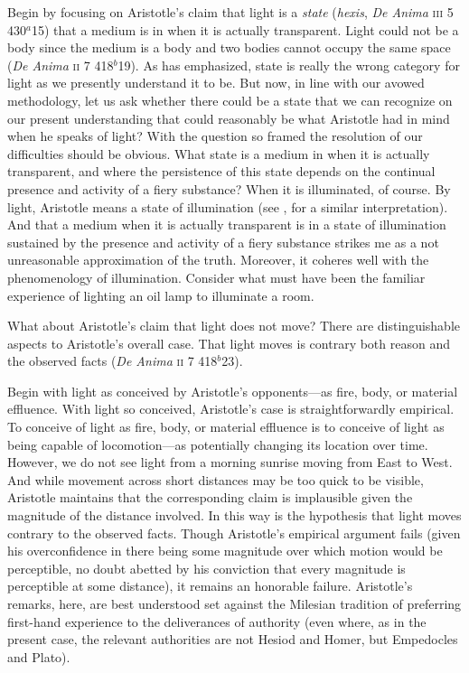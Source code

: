Begin by focusing on Aristotle's claim that light is a \emph{state} (\emph{hexis}, \emph{De Anima} \textsc{iii} 5 430\( ^{a} \)15) that a medium is in when it is actually transparent. Light could not be a body since the medium is a body and two bodies cannot occupy the same space (\emph{De Anima} \textsc{ii} 7 418\( ^{b} \)19). As \citet{Burnyeat:1995fk} has emphasized, state is really the wrong category for light as we presently understand it to be. But now, in line with our avowed methodology, let us ask whether there could be a state that we can recognize on our present understanding that could reasonably be what Aristotle had in mind when he speaks of light? With the question so framed the resolution of our difficulties should be obvious. What state is a medium in when it is actually transparent, and where the persistence of this state depends on the continual presence and activity of a fiery substance? When it is illuminated, of course. By light, Aristotle means a state of illumination (see \citealt[122]{Thorp:1982fk}, for a similar interpretation). And that a medium when it is actually transparent is in a state of illumination sustained by the presence and activity of a fiery substance strikes me as a not unreasonable approximation of the truth. Moreover, it coheres well with the phenomenology of illumination. Consider what must have been the familiar experience of lighting an oil lamp to illuminate a room.

What about Aristotle's claim that light does not move? There are distinguishable aspects to Aristotle's overall case. That light moves is contrary both reason and the observed facts (\emph{De Anima} \textsc{ii} 7 418\( ^{b} \)23).

Begin with light as conceived by Aristotle's opponents---as fire, body, or material effluence. With light so conceived, Aristotle's case is straightforwardly empirical. To conceive of light as fire, body, or material effluence is to conceive of light as being capable of locomotion---as potentially changing its location over time. However, we do not see light from a morning sunrise moving from East to West. And while movement across short distances may be too quick to be visible, Aristotle maintains that the corresponding claim is implausible given the magnitude of the distance involved. In this way is the hypothesis that light moves contrary to the observed facts. Though Aristotle's empirical argument fails (given his overconfidence in there being some magnitude over which motion would be perceptible, no doubt abetted by his conviction that every magnitude is perceptible at some distance), it remains an honorable failure. Aristotle's remarks, here, are best understood set against the Milesian tradition of preferring first-hand experience to the deliverances of authority (even where, as in the present case, the relevant authorities are not Hesiod and Homer, but Empedocles and Plato).


